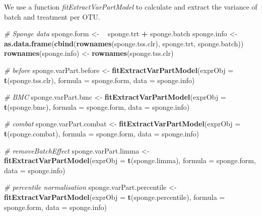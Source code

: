 \documentclass[]{book}
\newenvironment{Shaded}{\begin{snugshade}}{\end{snugshade}}
\newcommand{\KeywordTok}[1]{\textcolor[rgb]{0.13,0.29,0.53}{\textbf{#1}}}
\newcommand{\DataTypeTok}[1]{\textcolor[rgb]{0.13,0.29,0.53}{#1}}
\newcommand{\StringTok}[1]{\textcolor[rgb]{0.31,0.60,0.02}{#1}}
\newcommand{\CommentTok}[1]{\textcolor[rgb]{0.56,0.35,0.01}{\textit{#1}}}
\newcommand{\OperatorTok}[1]{\textcolor[rgb]{0.81,0.36,0.00}{\textbf{#1}}}
\newcommand{\ErrorTok}[1]{\textcolor[rgb]{0.64,0.00,0.00}{\textbf{#1}}}
\newcommand{\NormalTok}[1]{#1}
\begin{document}
We use a function \emph{fitExtractVarPartModel} to calculate and extract
the variance of batch and treatment per OTU.

\begin{Shaded}
\begin{Highlighting}[]
\CommentTok{# Sponge data}
\NormalTok{sponge.form <-}\StringTok{ }\ErrorTok{~}\StringTok{ }\NormalTok{sponge.trt }\OperatorTok{+}\StringTok{ }\NormalTok{sponge.batch}
\NormalTok{sponge.info <-}\StringTok{ }\KeywordTok{as.data.frame}\NormalTok{(}\KeywordTok{cbind}\NormalTok{(}\KeywordTok{rownames}\NormalTok{(sponge.tss.clr), sponge.trt, sponge.batch))}
\KeywordTok{rownames}\NormalTok{(sponge.info) <-}\StringTok{ }\KeywordTok{rownames}\NormalTok{(sponge.tss.clr)}

\CommentTok{# before}
\NormalTok{sponge.varPart.before <-}\StringTok{ }\KeywordTok{fitExtractVarPartModel}\NormalTok{(}\DataTypeTok{exprObj =} \KeywordTok{t}\NormalTok{(sponge.tss.clr), }
                                                \DataTypeTok{formula =}\NormalTok{ sponge.form, }
                                                \DataTypeTok{data =}\NormalTok{ sponge.info)}

\CommentTok{# BMC}
\NormalTok{sponge.varPart.bmc <-}\StringTok{ }\KeywordTok{fitExtractVarPartModel}\NormalTok{(}\DataTypeTok{exprObj =} \KeywordTok{t}\NormalTok{(sponge.bmc), }
                                             \DataTypeTok{formula =}\NormalTok{ sponge.form, }
                                             \DataTypeTok{data =}\NormalTok{ sponge.info)}

\CommentTok{# combat}
\NormalTok{sponge.varPart.combat <-}\StringTok{ }\KeywordTok{fitExtractVarPartModel}\NormalTok{(}\DataTypeTok{exprObj =} \KeywordTok{t}\NormalTok{(sponge.combat), }
                                                \DataTypeTok{formula =}\NormalTok{ sponge.form, }
                                                \DataTypeTok{data =}\NormalTok{ sponge.info)}

\CommentTok{# removeBatchEffect}
\NormalTok{sponge.varPart.limma <-}\StringTok{ }\KeywordTok{fitExtractVarPartModel}\NormalTok{(}\DataTypeTok{exprObj =} \KeywordTok{t}\NormalTok{(sponge.limma), }
                                               \DataTypeTok{formula =}\NormalTok{ sponge.form, }
                                               \DataTypeTok{data =}\NormalTok{ sponge.info)}

\CommentTok{# percentile normalisation}
\NormalTok{sponge.varPart.percentile <-}\StringTok{ }\KeywordTok{fitExtractVarPartModel}\NormalTok{(}\DataTypeTok{exprObj =} \KeywordTok{t}\NormalTok{(sponge.percentile), }
                                                    \DataTypeTok{formula =}\NormalTok{ sponge.form, }
                                                    \DataTypeTok{data =}\NormalTok{ sponge.info)}


\end{Highlighting}
\end{Shaded}
\end{document}
